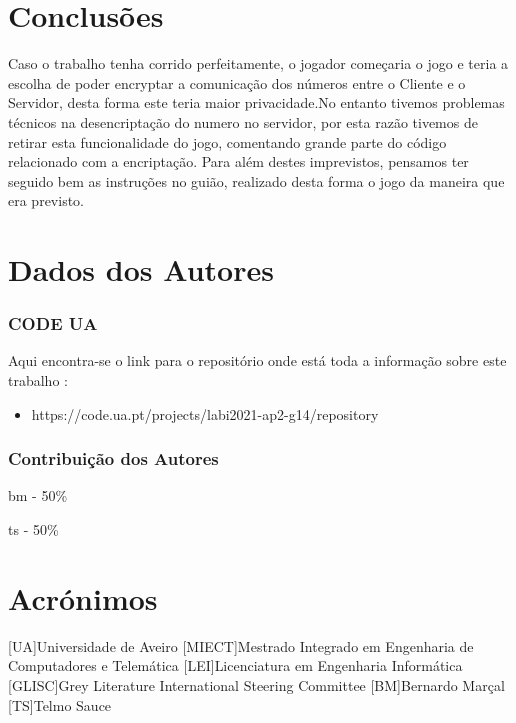 \documentclass{report}
\begin{document}
\chapter{Conclusões}
\label{chap.conclusao}
Caso o trabalho tenha corrido perfeitamente, o jogador começaria o jogo e teria a escolha de poder encryptar a comunicação dos números entre o Cliente e o Servidor, desta forma este teria maior privacidade.No entanto tivemos problemas técnicos na desencriptação do numero no servidor, por esta razão tivemos de retirar esta funcionalidade do jogo, comentando grande parte do código relacionado com a encriptação. Para além destes imprevistos, pensamos ter seguido bem as instruções no guião, realizado desta forma o jogo da maneira que era previsto.

\chapter*{Dados dos Autores}
\subsection{CODE UA}
Aqui encontra-se o link para o repositório onde está toda a informação sobre este trabalho :
\begin{itemize}
\item https://code.ua.pt/projects/labi2021-ap2-g14/repository
\end{itemize}
\subsection{Contribuição dos Autores}
\ac{bm} - 50\%\par
\noindent
\ac{ts} - 50\%\par

\chapter*{Acrónimos}
\begin{acronym}
[UA]{Universidade de Aveiro}
[MIECT]{Mestrado Integrado em Engenharia de Computadores e Telemática}
[LEI]{Licenciatura em Engenharia Informática}
[GLISC]{Grey Literature International Steering Committee}
[BM]{Bernardo Marçal}
[TS]{Telmo Sauce}
\end{acronym}



\printbibliography
\end{document}
